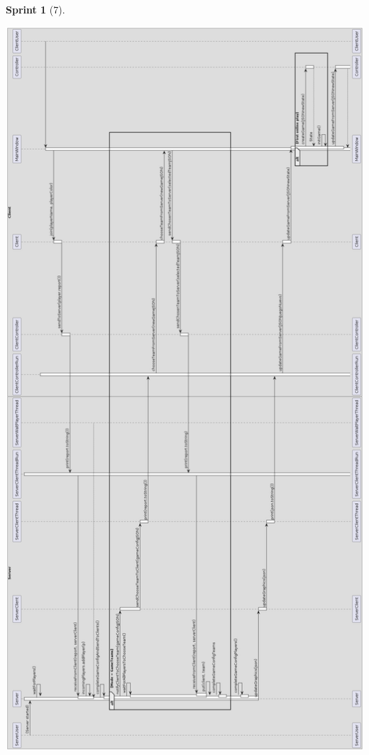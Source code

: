 \documentclass{article}
\theoremstyle{break}
\newtheorem*{sprint}{Sprint}
\begin{document}
\begin{sprint}[7]
\begin{center}
\includegraphics[scale=0.3]{empezarPartidaUmlSprint7.png}
\end{center}



\end{sprint}
\end{document}
